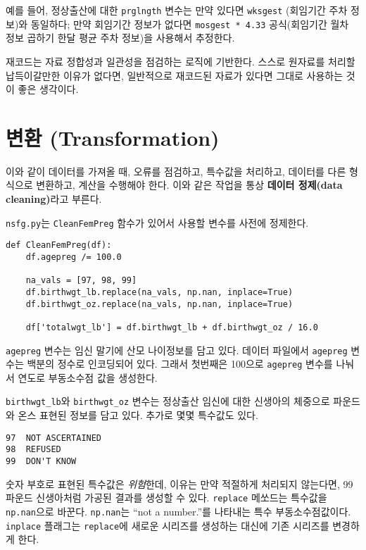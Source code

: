 예를 들어, 정상출산에 대한 {\tt prglngth} 변수는 만약 있다면 {\tt wksgest} (회임기간 주차 정보)와 동일하다; 만약 회임기간 정보가 없다면 {\tt mosgest * 4.33} 공식(회임기간 월차 정보 곱하기 한달 평균 주차 정보)을 사용해서 추정한다. 

재코드는 자료 정합성과 일관성을 점검하는 로직에 기반한다. 스스로 원자료를 처리할 납득이갈만한 이유가 없다면, 일반적으로 재코드된 자료가 있다면 그대로 사용하는 것이 좋은 생각이다. 

\section{변환 (Transformation)}
\label{cleaning}

이와 같이 데이터를 가져올 때, 오류를 점검하고, 특수값을 처리하고, 데이터를 다른 형식으로 변환하고, 계산을 수행해야 한다. 이와 같은 작업을 통상 {\bf 데이터 정제(data cleaning)}라고 부른다.

{\tt nsfg.py}는 {\tt CleanFemPreg} 함수가 있어서 사용할 변수를 사전에 정제한다.

\begin{verbatim}
def CleanFemPreg(df):
    df.agepreg /= 100.0

    na_vals = [97, 98, 99]
    df.birthwgt_lb.replace(na_vals, np.nan, inplace=True)
    df.birthwgt_oz.replace(na_vals, np.nan, inplace=True)

    df['totalwgt_lb'] = df.birthwgt_lb + df.birthwgt_oz / 16.0    
\end{verbatim}

{\tt agepreg} 변수는 임신 말기에 산모 나이정보를 담고 있다. 
데이터 파일에서 {\tt agepreg} 변수는 백분의 정수로 인코딩되어 있다.
그래서 첫번째은 100으로 {\tt agepreg} 변수를 나눠서 연도로 부동소수점 값을 생성한다.

\verb"birthwgt_lb"와 \verb"birthwgt_oz" 변수는 정상출산 임신에 대한 
신생아의 체중으로 파운드와 온스 표현된 정보를 담고 있다. 
추가로 몇몇 특수값도 있다.

\begin{verbatim}
97	NOT ASCERTAINED
98	REFUSED	 
99	DON'T KNOW
\end{verbatim}

숫자 부호로 표현된 특수값은 {\em 위험}한데, 이유는 만약 적절하게 처리되지 않는다면,
99 파운드 신생아처럼 가공된 결과를 생성할 수 있다. 
{\tt replace} 메쏘드는 특수값을 {\tt np.nan}으로 바꾼다. {\tt np.nan}는 
``not a number.''를 나타내는 특수 부동소수점값이다. 
{\tt inplace} 플래그는 {\tt replace}에 새로운 시리즈를 생성하는 대신에 
기존 시리즈를 변경하게 한다.

